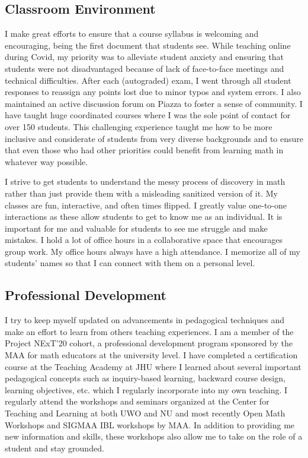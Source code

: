 \documentclass[10pt]{amsbook}
\begin{document}
\subsection*{Classroom Environment}
  I make great efforts to ensure that a course syllabus is welcoming and encouraging, being the first document that students see. 
  While teaching online during Covid, my priority was to alleviate student anxiety and ensuring that students were not disadvantaged because of lack of face-to-face meetings and technical difficulties. 
  After each (autograded) exam, I went through all student responses to reassign any points lost due to minor typos and system errors.
  I also maintained an active discussion forum on Piazza to foster a sense of community.
  I have taught huge coordinated courses where I was the sole point of contact for over 150 students.
  This challenging experience taught me how to be more inclusive and considerate of students from very diverse backgrounds and to ensure that even those who had other priorities could benefit from learning math in whatever way possible.

  I strive to get students to understand the messy process of discovery in math rather than just provide them with a misleading sanitized version of it.
  My classes are fun, interactive, and often times flipped.
  I greatly value one-to-one interactions as these allow students to get to know me as an individual.
  It is important for me and valuable for students to see me struggle and make mistakes. 
  I hold a lot of office hours in a collaborative space that encourages group work.
  My office hours always have a high attendance.
  I memorize all of my students' names so that I can connect with them on a personal level.

\subsection*{Professional Development}
  I try to keep myself updated on advancements in pedagogical techniques and make an effort to learn from others teaching experiences.
  I am a member of the Project NExT'20 cohort, a professional development program sponsored by the MAA for math educators at the university level.
  I have completed a certification course at the Teaching Academy at JHU where I learned about several important pedagogical concepts such as inquiry-based learning, backward course design, learning objectives, etc. which I regularly incorporate into my own teaching.
  I regularly attend the workshops and seminars organized at the Center for Teaching and Learning at both UWO and NU and most recently Open Math Workshops and SIGMAA IBL workshops by MAA.
  In addition to providing me new information and skills, these workshops also allow me to take on the role of a student and stay grounded.
\end{document}
